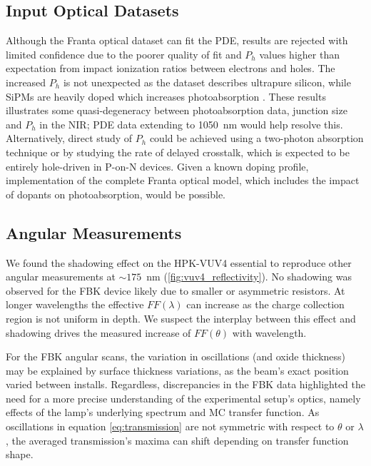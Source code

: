 \subsection{Input Optical Datasets}
Although the Franta optical dataset can fit the PDE, results are rejected with limited confidence due to the poorer quality of fit and $P_h$ values higher than expectation from impact ionization ratios between electrons and holes\cite{gallina_avalanche_2019, mcintyre_avalanche_1973, oldham_avalanche}. The increased $P_h$ is not unexpected as the dataset describes ultrapure silicon, while SiPMs are heavily doped which increases photoabsorption \cite{photoAbs_doping_Abroug2008}. These results illustrates some quasi-degeneracy between photoabsorption data, junction size and $P_h$ in the NIR; PDE data extending to 1050~nm would help resolve this. Alternatively, direct study of $P_h$ could be achieved using a two-photon absorption technique \cite{Pape_2024} or by studying the rate of delayed crosstalk, which is expected to be entirely hole-driven in P-on-N devices. Given a known doping profile, implementation of the complete Franta optical model, which includes the impact of dopants on photoabsorption, would be possible.

\subsection{Angular Measurements}
We found the shadowing effect on the HPK-VUV4 essential to reproduce other angular measurements at $\sim 175$~nm (\autoref{fig:vuv4_reflectivity}). No shadowing was observed for the FBK device likely due to smaller or asymmetric resistors. At longer wavelengths the effective $FF(\lambda)$ can increase as the charge collection region is not uniform in depth\cite{ACERBI2018_FF}. We suspect the interplay between this effect and shadowing drives the measured increase of $FF(\theta)$ with wavelength.

For the FBK angular scans, the variation in oscillations (and oxide thickness) may be explained by surface thickness variations, as the beam's exact position varied between installs. Regardless, discrepancies in the FBK data highlighted the need for a more precise understanding of the experimental setup's optics, namely effects of the lamp's underlying spectrum and MC transfer function. As oscillations in equation \autoref{eq:transmission} are not symmetric with respect to $\theta$ or $\lambda$, the averaged transmission's maxima can shift depending on transfer function shape.

